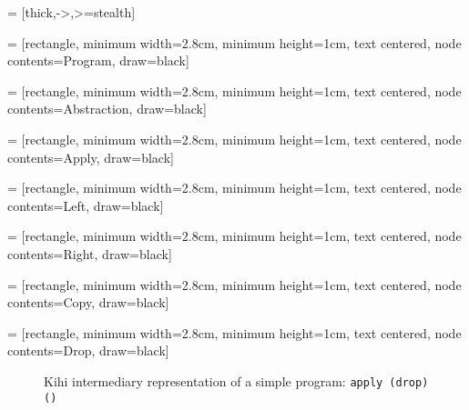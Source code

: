  = [thick,->,>=stealth]

 = [rectangle, minimum width=2.8cm, minimum height=1cm, text centered, node contents=Program, draw=black]

 = [rectangle, minimum width=2.8cm, minimum height=1cm, text centered, node contents=Abstraction, draw=black]

 = [rectangle, minimum width=2.8cm, minimum height=1cm, text centered, node contents=Apply, draw=black]

 = [rectangle, minimum width=2.8cm, minimum height=1cm, text centered, node contents=Left, draw=black]

 = [rectangle, minimum width=2.8cm, minimum height=1cm, text centered, node contents=Right, draw=black]

 = [rectangle, minimum width=2.8cm, minimum height=1cm, text centered, node contents=Copy, draw=black]

 = [rectangle, minimum width=2.8cm, minimum height=1cm, text centered, node contents=Drop, draw=black]

\begin{figure}[htb]
    \centering
    \caption{Kihi intermediary representation of a simple program: \lstinline{apply (drop) ()}}
    \label{fig:kihi_intermediary_representation_example_1}
\end{figure}


